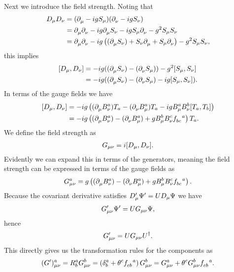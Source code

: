 Next we introduce the field strength. Noting that
\begin{align*}
D_{\mu}D_{\nu} &= (\partial^{}_{\mu} - igS_{\mu})(\partial^{}_{\nu} - igS_{\nu}) \\
&= \partial^{}_{\mu}\partial^{}_{\nu} - ig\partial^{}_{\mu}S_{\nu} - igS_{\mu}\partial^{}_{\nu} - g^{2}S_{\mu}S_{\nu} \\
&= \partial^{}_{\mu}\partial^{}_{\nu} - ig\left((\partial^{}_{\mu}S_{\nu}) + S_{\nu}\partial^{}_{\mu} + S_{\mu}\partial^{}_{\nu}\right) - g^{2}S_{\mu}S_{\nu},
\end{align*}
this implies
\begin{align*}
\comm{D_{\mu}}{D_{\nu}} &= -ig((\del{}{\mu}S_{\nu}) - (\del{}{\nu}S_{\mu})) - g^{2}\comm{S_{\mu}}{S_{\nu}} \\
&= -ig((\del{}{\mu}S_{\nu}) - (\del{}{\nu}S_{\mu}) - ig\comm{S_{\mu}}{S_{\nu}}).
\end{align*}
In terms of the gauge fields we have
\begin{align*}
\comm{D_{\mu}}{D_{\nu}} &= -ig\left((\del{}{\mu}B_{\nu}^{a})T_{a} - (\del{}{\nu}B_{\mu}^{a})T_{a} - igB_{\mu}^{a}B_{\nu}^{b}\comm{T_{a}}{T_{b}}\right) \\
&= -ig\left((\del{}{\mu}B_{\nu}^{a}) - (\del{}{\nu}B_{\mu}^{a}) + gB_{\mu}^{b}B_{\nu}^{c}\srconst{bc}{a}\right)T_{a}.
\end{align*}
We define the field strength as
\begin{align*}
G_{\mu\nu} = i\comm{D_{\mu}}{D_{\nu}}.
\end{align*}
Evidently we can expand this in terms of the generators, meaning the field strength can be expressed in terms of the gauge fields as
\begin{align*}
G_{\mu\nu}^{a} = g\left((\del{}{\mu}B_{\nu}^{a}) - (\del{}{\nu}B_{\mu}^{a}) + gB_{\mu}^{b}B_{\nu}^{c}\srconst{bc}{a}\right).
\end{align*}
Because the covariant derivative satisfies $D_{\mu}^{\prime}\Psi^{\prime} = UD_{\mu}\Psi$ we have
\begin{align*}
G_{\mu\nu}^{\prime}\Psi^{\prime} = UG_{\mu\nu}\Psi,
\end{align*}
hence
\begin{align*}
G_{\mu\nu}^{\prime} = UG_{\mu\nu}U^{\dagger}.
\end{align*}
This directly gives us the transformation rules for the components as
\begin{align*}
(G\p)_{\mu\nu}^{a} = R_{b}^{a}G_{\mu\nu}^{b} = \left(\kdelta{a}{b} + \theta^{c}\srconst{cb}{a}\right)G_{\mu\nu}^{b} = G_{\mu\nu}^{a} + \theta^{c}G_{\mu\nu}^{b}\srconst{cb}{a}.
\end{align*}

